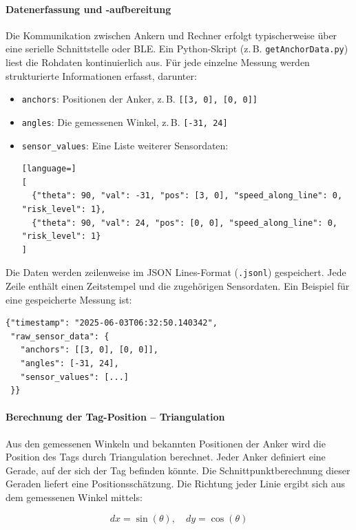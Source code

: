 \documentclass[a4paper, 12pt]{article} %
\begin{document}
\paragraph{Datenerfassung und -aufbereitung}

Die Kommunikation zwischen Ankern und Rechner erfolgt typischerweise über eine serielle Schnittstelle oder \ac{BLE}. 
Ein Python-Skript (z.\,B. \texttt{getAnchorData.py}) liest die Rohdaten kontinuierlich aus. Für jede einzelne Messung werden strukturierte Informationen
erfasst, darunter:

\begin{itemize}
    \item \texttt{anchors}: Positionen der Anker, z.\,B. \texttt{[[3, 0], [0, 0]]}
    \item \texttt{angles}: Die gemessenen Winkel, z.\,B. \texttt{[-31, 24]}
    \item \texttt{sensor\_values}: Eine Liste weiterer Sensordaten:
\begin{lstlisting}[language=]
[
  {"theta": 90, "val": -31, "pos": [3, 0], "speed_along_line": 0, "risk_level": 1},
  {"theta": 90, "val": 24, "pos": [0, 0], "speed_along_line": 0, "risk_level": 1}
]
\end{lstlisting}
\end{itemize}

Die Daten werden zeilenweise im JSON Lines-Format (\texttt{.jsonl}) gespeichert. Jede Zeile enthält einen Zeitstempel und die zugehörigen Sensordaten. 
Ein Beispiel für eine gespeicherte Messung ist:

\begin{verbatim}
{"timestamp": "2025-06-03T06:32:50.140342", 
 "raw_sensor_data": {
   "anchors": [[3, 0], [0, 0]], 
   "angles": [-31, 24], 
   "sensor_values": [...]
 }}
\end{verbatim}

\paragraph{Berechnung der Tag-Position – Triangulation}

Aus den gemessenen Winkeln und bekannten Positionen der Anker wird die Position des Tags durch Triangulation berechnet. Jeder Anker 
definiert eine Gerade, auf der sich der Tag befinden könnte. Die Schnittpunktberechnung dieser Geraden liefert eine Positionsschätzung. Die Richtung 
jeder Linie ergibt sich aus dem gemessenen Winkel mittels:

\[
dx = \sin(\theta), \quad dy = \cos(\theta)
\]
\end{document}
